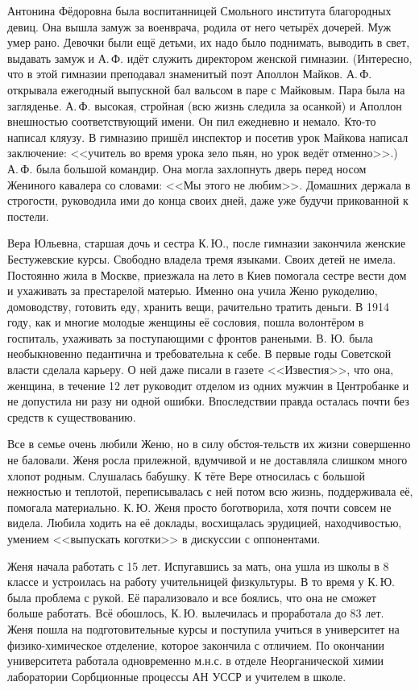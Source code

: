 Антонина Фёдоровна была воспитанницей Смольного
\linebreak
института благородных девиц.
Она вышла замуж за военврача, родила от него четырёх дочерей. Муж умер рано. Девочки были ещё детьми, их надо было поднимать, выводить в свет, выдавать замуж и А.\,Ф. идёт служить директором женской гимназии. (Интересно, что в этой гимназии преподавал знаменитый поэт Аполлон Майков. А.\,Ф. открывала ежегодный выпускной бал вальсом в паре с Майковым. Пара была на загляденье. А.\,Ф. высокая, стройная (всю жизнь следила за осанкой) и Аполлон внешностью соответствующий имени. Он пил ежедневно и немало. Кто-то написал кляузу. В гимназию пришёл инспектор и посетив урок Майкова написал заключение: <<учитель во время урока зело пьян, но урок ведёт отменно>>.) А.\,Ф. была большой командир. Она могла захлопнуть дверь перед носом Жениного кавалера со словами: <<Мы этого не любим>>. Домашних держала в строгости, руководила ими до конца своих дней, даже уже будучи прикованной к постели.

Вера Юльевна, старшая дочь и сестра К.\,Ю., после гимназии закончила женские Бестужевские курсы. Свободно владела тремя языками. Своих детей не имела. Постоянно жила в Москве, приезжала на лето в Киев помогала сестре вести дом и ухаживать за престарелой матерью. Именно она учила Женю рукоделию, домоводству, готовить еду, хранить вещи, рачительно тратить деньги. В 1914 году, как и многие молодые женщины её сословия, пошла волонтёром в госпиталь, ухаживать за поступающими с фронтов ранеными. В. Ю. была необыкновенно педантична и требовательна к себе. В первые годы Советской власти сделала карьеру. О ней даже писали в газете <<Известия>>, что она, женщина, в течение 12 лет руководит отделом из одних мужчин в Центробанке и не допустила ни разу ни одной ошибки. Впоследствии правда осталась почти без средств к существованию.

Все в семье очень любили Женю, но в силу
обстоя-\linebreak тельств
их жизни совершенно не баловали.
Женя росла прилежной, вдумчивой и не доставляла слишком много хлопот родным. Слушалась бабушку. К тёте Вере относилась с большой нежностью и теплотой, переписывалась с ней потом всю жизнь, поддерживала её, помогала материально. К.\,Ю. Женя просто боготворила, хотя почти совсем не видела. Любила ходить на её доклады, восхищалась эрудицией, находчивостью, умением <<выпускать коготки>> в дискуссии с оппонентами.

Женя начала работать с 15 лет. Испугавшись за мать, она ушла из школы в 8 классе и устроилась на работу учительницей физкультуры. В то время у К.\,Ю. была проблема с рукой. Её парализовало и все боялись, что она не сможет больше работать. Всё обошлось, К.\,Ю. вылечилась и проработала до 83 лет. Женя пошла на подготовительные курсы и поступила учиться в университет на физико-химическое отделение, которое закончила с отличием. По окончании университета работала одновременно м.н.с. в отделе Неорганической химии лаборатории Сорбционные процессы АН \linebreak УССР и учителем в школе.

